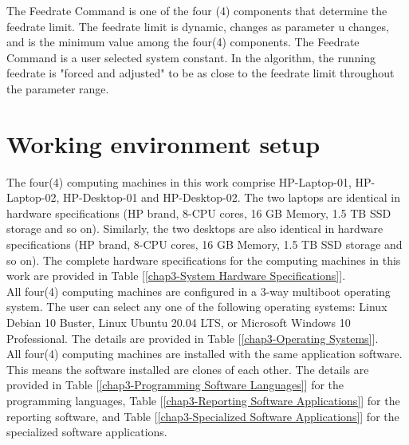 The Feedrate Command is one of the four (4) components that determine the feedrate limit. The feedrate limit is dynamic, changes as parameter u changes, and is the minimum value among the four(4) components. The Feedrate Command is a user selected system constant. In the algorithm, the running feedrate is "forced and adjusted" to be as close to the feedrate limit throughout the parameter range.


\clearpage
\pagebreak

\section{Working environment setup}

The four(4) computing machines in this work comprise HP-Laptop-01, HP-Laptop-02, HP-Desktop-01 and HP-Desktop-02. The two laptops are identical in hardware specifications (HP brand, 8-CPU cores, 16 GB Memory, 1.5 TB SSD storage and so on). Similarly, the two desktops are also identical in hardware specifications (HP brand, 8-CPU cores, 16 GB Memory, 1.5 TB SSD storage and so on). The complete hardware specifications for the computing machines in this work are provided in Table [\ref{chap3-System Hardware Specifications}].\\

All four(4) computing machines are configured in a 3-way multiboot operating system. The user can select any one of the following operating systems: Linux Debian 10 Buster, Linux Ubuntu 20.04 LTS, or Microsoft Windows 10 Professional. The details are provided in Table [\ref{chap3-Operating Systems}].\\ 

All four(4) computing machines are installed with the same application software. This means the software installed are clones of each other. The details are provided in Table [\ref{chap3-Programming Software Languages}] for the programming languages, Table [\ref{chap3-Reporting Software Applications}] for the reporting software, and Table [\ref{chap3-Specialized Software Applications}] for the specialized software applications.\\

